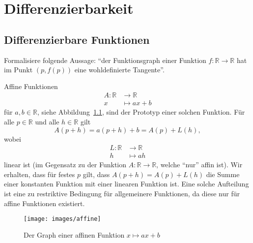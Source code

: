 \documentclass[../main.tex]{subfiles}
\begin{document}
\chapter{Differenzierbarkeit}
\section{Differenzierbare Funktionen}
\begin{goal}
  Formalisiere
  folgende Aussage:
  ``der Funktionsgraph einer Funktion
  $f \colon \mathbb{R} \to \mathbb{R}$
  hat im Punkt $(p, f(p))$ eine
  wohldefinierte Tangente''.
\end{goal}

Affine Funktionen
\begin{align*}
  A \colon \mathbb{R} & \to \mathbb{R} \\
  x & \mapsto ax + b
\end{align*}
für $a, b \in \mathbb{R}$,
siehe Abbildung~\ref{fig:affin},
sind der Prototyp
einer solchen Funktion.
Für alle $p \in \mathbb{R}$ und
alle $h \in \mathbb{R}$ gilt
\[
  A(p+h) = a(p+ h) + b = A(p) + L(h),
\]
wobei
\begin{align*}
  L \colon \mathbb{R} & \to \mathbb{R} \\
  h & \mapsto ah
\end{align*}
linear ist (im Gegensatz
zu der Funktion
$A \colon \mathbb{R} \to \mathbb{R}$,
welche ``nur'' affin ist).
Wir erhalten, dass für festes $p$
gilt, dass
  $A(p+h) = A(p) + L(h)$
die Summe einer konstanten
Funktion mit einer linearen Funktion ist.
Eine solche Aufteilung ist
eine zu restriktive Bedingung
für allgemeinere Funktionen,
da diese nur für affine Funktionen
existiert.


\begin{figure}[htb]
  \centering
  \texttt{[image: images/affine]}
  \caption{Der
  Graph einer affinen Funktion
$x \mapsto ax + b$}%
  \label{fig:affin}
\end{figure}
\end{document}
